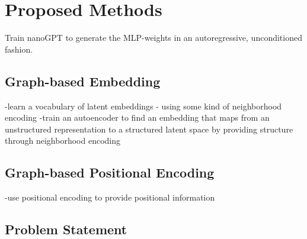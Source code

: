 \section{Proposed Methods}
\label{sec:method}

Train nanoGPT to generate the MLP-weights in an autoregressive, unconditioned fashion.

\subsection{Graph-based Embedding}
-learn a vocabulary of latent embeddings - using some kind of neighborhood encoding
-train an autoencoder to find an embedding that maps from an unstructured representation
to a structured latent space by providing structure through neighborhood encoding

\subsection{Graph-based Positional Encoding}
-use positional encoding to provide positional information



\subsection{Problem Statement}